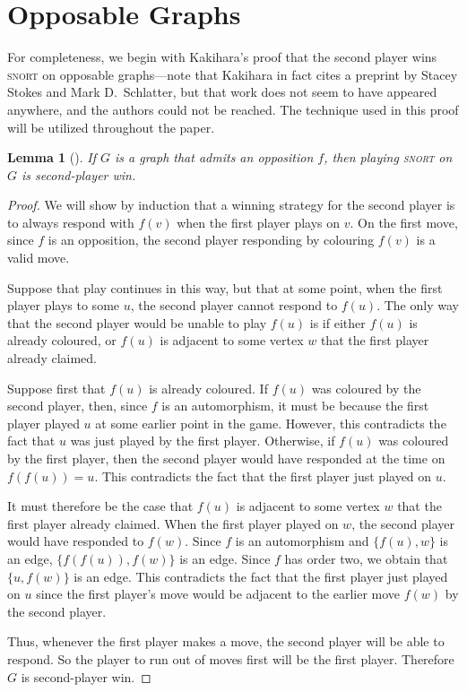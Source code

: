 \documentclass[11pt]{article}
\newtheorem{lemma}[theorem]{Lemma}
\theoremstyle{definition}
\begin{document}
\section{Opposable Graphs}
\label{sec: opposable graphs}

For completeness, we begin with Kakihara's proof \cite{kakihara:snort} that the
second player wins \textsc{snort} on opposable graphs---note that Kakihara in
fact cites a preprint by Stacey Stokes and Mark D.\ Schlatter, but that work
does not seem to have appeared anywhere, and the authors could not be reached.
The technique used in this proof will be utilized throughout the paper.

\begin{lemma}[{\cite[Proposition 3.6 on p.~24]{kakihara:snort}}]
    \label{lem: opposable implies second player wins snort}
    If $G$ is a graph that admits an opposition $f$, then playing
    \textsc{snort} on $G$ is second-player win.
\end{lemma}

\begin{proof}
    We will show by induction that a winning strategy for the second player is
    to always respond with $f(v)$ when the first player plays on $v$. On the
    first move, since $f$ is an opposition, the second player responding by
    colouring $f(v)$ is a valid move.

    Suppose that play continues in this way, but that at some point, when the
    first player plays to some $u$, the second player cannot respond to $f(u)$.
    The only way that the second player would be unable to play $f(u)$ is if
    either $f(u)$ is already coloured, or $f(u)$ is adjacent to some vertex $w$
    that the first player already claimed.

    Suppose first that $f(u)$ is already coloured. If $f(u)$ was coloured by
    the second player, then, since $f$ is an automorphism, it must be because
    the first player played $u$ at some earlier point in the game. However,
    this contradicts the fact that $u$ was just played by the first player.
    Otherwise, if $f(u)$ was coloured by the first player, then the second
    player would have responded at the time on $f(f(u)) = u$. This contradicts
    the fact that the first player just played on $u$.

    It must therefore be the case that $f(u)$ is adjacent to some vertex $w$
    that the first player already claimed. When the first player played on $w$,
    the second player would have responded to $f(w)$. Since $f$ is an
    automorphism and $\{f(u),w\}$ is an edge, $\{f(f(u)),f(w)\}$ is an edge.
    Since $f$ has order two, we obtain that $\{u,f(w)\}$ is an edge. This
    contradicts the fact that the first player just played on $u$ since the
    first player's move would be adjacent to the earlier move $f(w)$ by the
    second player.

    Thus, whenever the first player makes a move, the second player will be
    able to respond. So the player to run out of moves first will be the first
    player. Therefore $G$ is second-player win.
\end{proof}
\end{document}
